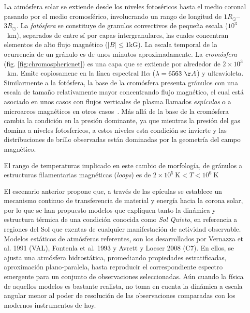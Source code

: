 \documentclass[9pt]{book}
\begin{document}
La atm\'osfera solar se extiende desde los niveles fotos\'ericos hasta el medio coronal pasando por el medio cromosf\'erico, involucrando un rango de longitud de $1R_{\odot}$--$3R_{\odot}$. La \emph{fot\'osfera} se constituye de granulos convectivos de peque\~na escala ($10^3$~km), separados de entre s\'i por capas intergranulares, las cuales concentran elementos de alto flujo magn\'etico ($|B| \le 1\mbox{kG}$). La escala temporal de la ocurrencia de un gr\'anulo es de unos minutos aproximadamente. La \emph{crom\'osfera} (fig. \ref{fig:chromosphericnet}) es una capa que se extiende por alrededor de $2\times 10^3$~km. Emite copiosamene en la l\'inea espectral H$\alpha$ ($\lambda=6563~\AA$) y ultravioleta. Similarmente a la fot\'osfera, la base de la crom\'osfera presenta gr\'anulos con una escala de tama\~no relativamente mayor concentrando flujo magn\'etico, el cual est\'a asociado en unos casos con flujos verticales de plasma llamados \emph{esp\'iculas} o a microarcos magn\'eticos en otros casos~\cite{NASAweb}. M\'as all\'a de la base de la crom\'osfera cambia la condici\'on en la presi\'on dominante, ya que mientras la presi\'on del gas domina a niveles fotosfericos, a estos niveles esta condici\'on se invierte y las distribuciones de brillo observadas est\'an dominadas por la geometr\'ia del campo magn\'etico. 


El rango de temperaturas implicado en este cambio de morfolog\'ia, de gr\'anulos a estructuras filamentarias magn\'eticas (\emph{loops}) es de $2\times 10^5~\mbox{K} < T < 10^6~\mbox{K}$

El escenario anterior propone que, a trav\'es de las ep\'iculas se establece un mecanismo continuo de transferencia de material y energ\'ia hacia la corona solar, por lo que se han propuesto modelos que expliquen tanto la din\'amica y estructura t\'ermica de una condici\'on conocida como \emph{Sol Quieto}, en referencia a regiones del Sol que exentas de cualquier manifestaci\'on de actividad observable. Modelos est\'aticos de atm\'osferas referentes, son los desarrollados por Vernazza et al. 1991 (VAL), Fontenla et al. 1993 y Avrett y Loeser 2008 (C7). En ellos, se ajusta una atm\'osfera hidrost\'atica, promediando propiedades estratificadas,  aproximaci\'on plano-paralela, hasta reproducir el correspondiente espectro emergente para un conjunto de observaciones seleccionadas. A\'un cuando la f\'isica de aquellos modelos es bastante realista, no toma en cuenta la din\'amica a escala angular menor al poder de resoluci\'on de las observaciones comparadas con los modernos instrumentos de hoy. 
\end{document}
